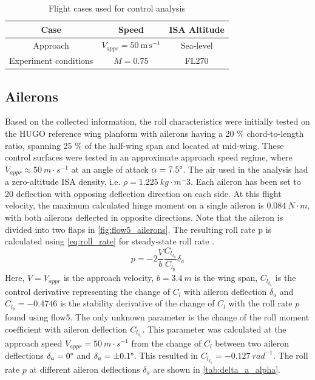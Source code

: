 \begin{table}[H]
    \centering
    \caption{Flight cases used for control analysis}
    \label{tab:flow5_flight_cases}
    \begin{tabular}{|c|c|c|}
        \hline
        \textbf{Case} & \textbf{Speed} & \textbf{ISA Altitude} \\
        \hline\hline
        Approach & \(V_{appr}=50~\mathrm{m\,s^{-1}}\) & Sea-level\\\hline
        Experiment conditions & \(M=0.75\) & FL270 \\
        \hline
    \end{tabular}
\end{table}

\subsection{Ailerons}
Based on the collected information, the roll characteristics were initially tested on the HUGO reference wing planform with ailerons having a 20 \% chord-to-length ratio, spanning 25 \% of the half-wing span and located at mid-wing. These control surfaces were tested in an approximate approach speed regime, where $V_{appr} \approx 50 \ m \cdot s^{-1}$ at an angle of attack $\alpha=7.5 \degree$. The air used in the analysis had a zero-altitude ISA density, i.e. $\rho = 1.225 \ kg \cdot m^-3$. Each aileron has been set to 20 \degree deflection with opposing deflection direction on each side. At this flight velocity, the maximum calculated hinge moment on a single aileron is $0.084 \ N\cdot m$, with both ailerons deflected in opposite directions. Note that the aileron is divided into two flaps in \autoref{fig:flow5_ailerons}. The resulting roll rate p is calculated using \autoref{eq:roll_rate} for steady-state roll rate \cite{nelson1998flight}.
\begin{equation}
    p = -2 \frac{V}{b} \frac{C_{l_{\delta_{a}}}}{C_{l_{p}}}\delta_a
    \label{eq:roll_rate}
\end{equation}
Here, $V = V_{appr}$ is the approach velocity, $b = 3.4\ m$ is the wing span, $C_{l_{\delta_{a}}}$ is the control derivative representing the change of $C_l$ with aileron deflection $\delta_a$ and $C_{l_{p}} = -0.4746$ is the stability derivative of the change of $C_l$ with the roll rate $p$ found using flow5. The only unknown parameter is the change of the roll moment coefficient with aileron deflection $C_{l_{\delta_{a}}}$. This parameter was calculated at the approach speed $V_{appr} = 50 \ m \cdot s^{-1}$ from the change of $C_l$ between two aileron deflections $\delta_a = 0 \degree$ and $\delta_a = \pm0.1 \degree$. This resulted in $C_{l_{\delta_{a}}} = -0.127 \ rad^{-1}$. The roll rate $p$ at different aileron deflections $\delta_{a}$ are shown in \autoref{tab:delta_a_alpha}.
